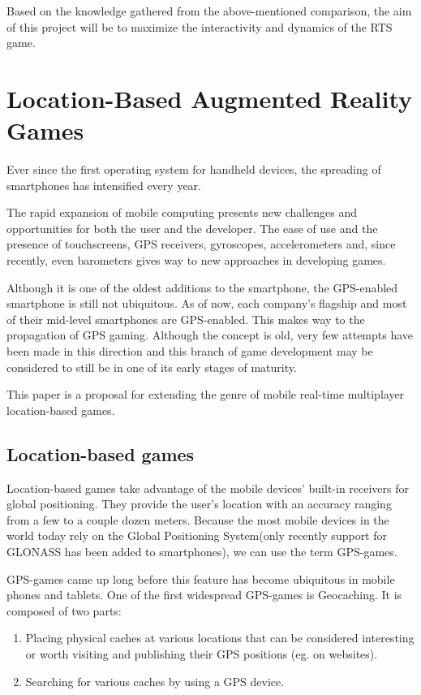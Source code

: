 \documentclass{article}
\begin{document}
Based on the knowledge gathered from the above-mentioned comparison, the aim of
this project will be to maximize the interactivity and dynamics of the RTS game.


\section{Location-Based Augmented Reality Games}

Ever since the first operating system for handheld devices, the spreading of
smartphones has intensified every year.\newline

The rapid expansion of mobile computing presents new challenges and
opportunities for both the user and the developer. The ease of use and the
presence of touchscreens, GPS receivers, gyroscopes, accelerometers and, since
recently, even barometers gives way to new approaches in developing
games.\newline

Although it is one of the oldest additions to the smartphone, the GPS-enabled
smartphone is still not ubiquitous. As of now, each company's flagship
and most of their mid-level smartphones are GPS-enabled. This makes way to the
propagation of GPS gaming. Although the concept is old, very few attempts have
been made in this direction and this branch of game development may be
considered to still be in one of its early stages of maturity.\newline

This paper is a proposal for extending the genre of mobile real-time multiplayer
location-based games.

\subsection{Location-based games}
Location-based games take advantage of the mobile devices' built-in receivers
for global positioning. They provide the user's location with an accuracy
ranging from a few to a couple dozen meters. Because the most mobile devices in
the world today rely on the Global Positioning System(only recently support for
GLONASS has been added to smartphones), we can use the term GPS-games.\newline

GPS-games came up long before this feature has become ubiquitous in mobile
phones and tablets. One of the first widespread GPS-games is Geocaching. It is
composed of two parts: 
\begin{enumerate}
  \item Placing physical caches at various locations that can be considered
  interesting or worth visiting and publishing their GPS positions (eg. on
  websites).
  \item Searching for various caches by using a GPS device.
\end{enumerate}
\end{document}
